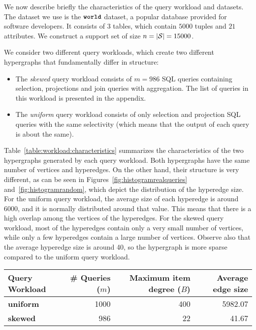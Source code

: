 We now describe briefly the characteristics of the query workload and datasets. The dataset we use is the $\texttt{\bfseries world}$ dataset, a popular database provided for software developers. 
It consists of $3$ tables, which contain $5000$ tuples and $21$ attributes. We construct a support set of size $n = |\mathcal{S}| = 15000$.

We consider two different query workloads, which create two different hypergraphs that fundamentally differ in structure:
%
\begin{itemize}
\item The {\em skewed} query workload consists of $m = 986$ SQL queries containing selection, projections and join queries with aggregation. The list of queries in this workload is presented in the appendix. 

%
\item The {\em uniform} query workload consists of only selection and projection SQL queries with the same selectivity (which means that the output of each query is about the same). 
\end{itemize}



Table~\ref{table:workload:characteristics} summarizes the characteristics of the two hypergraphs
generated by each query workload. Both hypergraphs have the same number of vertices and
hyperedges. On the other hand, their structure is very different, as can be seen in 
Figures~\ref{fig:histogramrealqueries} and~\ref{fig:histogramrandom}, which depict the distribution of the hyperedge size. For the uniform query workload, the average size of each hyperedge is around 6000, and it is normally distributed around that value. This means that there is a high overlap among the vertices of the hyperedges. For the skewed query workload, most of the hyperedges contain only a very small number of vertices, while only a few hyperedges contain a large number of vertices. Observe also that the average hyperedge size is around 40, so the hypergraph is more sparse
compared to the uniform query workload.

\begin{table*}[h] \centering
	\begin{small}
		\begin{tabular}{@{}lrrr@{}}\toprule
			\textbf{Query Workload} & \textbf{\# Queries ($m$)} & \textbf{Maximum item degree ($B$)} & \textbf{Average edge size} \\ \midrule
			\textbf{uniform} &  1000 & 400 & 5982.07   \\ \hdashline
			\textbf{skewed} &  986 & 22 & 41.67    \\ 
			
			\bottomrule
		\end{tabular}
	\end{small}
	\caption{Hypergraph Characteristics}
	\label{table:workload:characteristics}
\end{table*}

